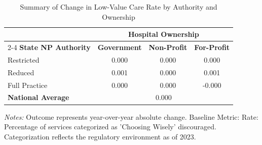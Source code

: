 \begin{table}[htbp]
    \centering
    \caption{Summary of Change in Low-Value Care Rate by Authority and Ownership}
    \label{tab:d_partb_low_value_rate_own}
    \vspace{0.2cm}
    \begin{tabular}{lccc}
        \toprule
        & \multicolumn{3}{c}{\textbf{Hospital Ownership}} \\
        \cmidrule(lr){2-4}
        \textbf{State NP Authority} & \textbf{Government} & \textbf{Non-Profit} & \textbf{For-Profit} \\
        \midrule
        Restricted & 0.000 & 0.000 & 0.000 \\
        Reduced & 0.001 & 0.000 & 0.001 \\
        Full Practice & 0.000 & 0.000 & -0.000 \\
        \midrule
        \textbf{National Average} & \multicolumn{3}{c}{0.000} \\
        \bottomrule
    \end{tabular}
    \vspace{0.1cm}
    \begin{minipage}{0.85\textwidth}
        \footnotesize \textit{Notes:} Outcome represents year-over-year absolute change. Baseline Metric: Rate: Percentage of services categorized as 'Choosing Wisely' discouraged. Categorization reflects the regulatory environment as of 2023.
    \end{minipage}
\end{table}